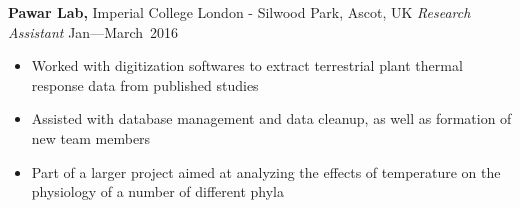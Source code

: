 
\vspace{7pt}

\textbf{Pawar Lab,} Imperial College London - Silwood Park, Ascot, UK \newline
\emph{Research Assistant} \hfill{Jan–--March~2016}
\begin{itemize}
  \item Worked with digitization softwares to extract terrestrial plant thermal response data from published studies
  \item Assisted with database management and data cleanup, as well as formation of new team members
  \item Part of a larger project aimed at analyzing the effects of temperature on the physiology of a number of different phyla
\end{itemize}
